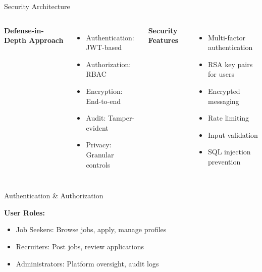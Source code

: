 \documentclass[aspectratio=169]{beamer}
\begin{document}
\begin{frame}{Security Architecture}
\begin{columns}
\textbf{Defense-in-Depth Approach}
\begin{itemize}
    \item Authentication: JWT-based
    \item Authorization: RBAC
    \item Encryption: End-to-end
    \item Audit: Tamper-evident
    \item Privacy: Granular controls
\end{itemize}

\textbf{Security Features}
\begin{itemize}
    \item Multi-factor authentication
    \item RSA key pairs for users
    \item Encrypted messaging
    \item Rate limiting
    \item Input validation
    \item SQL injection prevention
\end{itemize}
\end{columns}
\end{frame}

\begin{frame}{Authentication \& Authorization}
\begin{center}
\end{center}

\vspace{0.5cm}
\textbf{User Roles:}
\begin{itemize}
    \item Job Seekers: Browse jobs, apply, manage profiles
    \item Recruiters: Post jobs, review applications
    \item Administrators: Platform oversight, audit logs
\end{itemize}
\end{frame}
\end{document}

